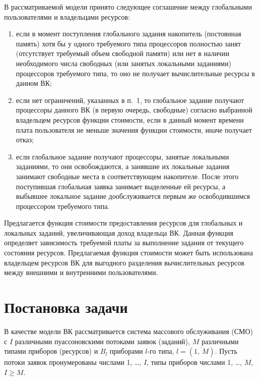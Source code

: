 \begin{multicols}{2}
  В рассматриваемой модели принято следующее соглашение между
глобальными пользователями и владельцами ресурсов:
  \begin{enumerate}[(1)]
\item если в момент поступления глобального задания накопитель (постоянная
память) хотя бы у одного требуемого типа процессоров пол\-ностью занят
(отсутствует требуемый объем свободной памяти) или нет в наличии
необходимого чис\-ла свободных (или занятых локальными заданиями)
процессоров требуемого типа, то оно не получает вычислительные ресурсы в
данном ВК;
\item если нет ограничений, указанных в п.~1, то глобальное задание
получают процессоры данного ВК (в первую очередь, свободные) согласно
выбранной владельцем ресурсов функции стоимости, если в данный момент
времени плата пользователя не меньше значения функции стоимости, иначе
получает отказ;
\item если глобальное задание получают процессоры, занятые локальными
заданиями, то они освобождаются, а занявшие их локальные задания занимают
свободные места в соответствующем накопителе. После этого поступившая
глобальная заявка занимает выделенные ей ресурсы, а выбывшее локальное
задание дообслуживается первым же освободившимся процессором требуемого
типа.
\end{enumerate}

  Предлагается функция стоимости предоставления ресурсов для глобальных и
локальных заданий, увеличивающая доход владельца ВК. Данная функция
определяет зависимость требуемой платы за выполнение задания от текущего
состояния ресурсов. Предлагаемая функция стоимости может быть
использована владельцем ресурсов ВК для выгодного разделения
вычислительных ресурсов между внешними и внутренними пользователями.


\section{Постановка задачи}

  В качестве модели ВК рассматривается сис\-те\-ма массового обслуживания (СМО)
  с $I$ различными
пуассоновскими потоками заявок (заданий), $M$ различными типами приборов
(ресурсов) и $B_l$ приборами $l$-го типа, $l = (\overline{1,\,M})$. Пусть потоки
заявок пронумерованы числами 1, \ldots , $I$, типы приборов числами 1, \ldots ,
$M$, $I\geq M$.


\end{multicols}
